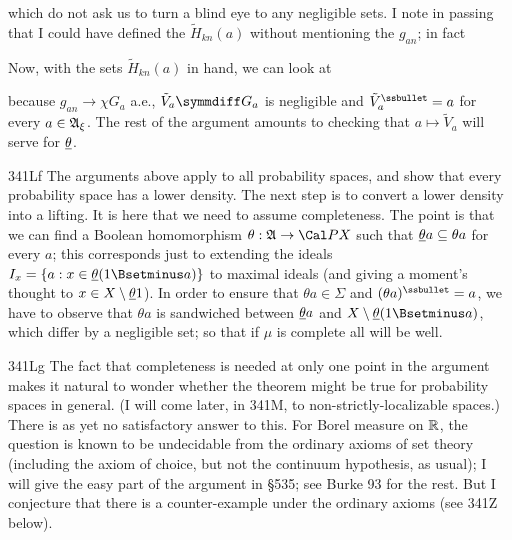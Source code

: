 {


\noindent which do not ask us to turn a blind eye to any negligible
sets.   I note in passing that I could have defined the
$\tilde H_{kn}(a)$ without mentioning the $g_{an}$;  in fact


\medskip

 Now, with the sets $\tilde H_{kn}(a)$ in hand, we can
look at


\noindent because $g_{an}\to \chi G_a$ a.e., $\tilde V_a\symmdiff G_a$
is negligible and $\tilde V_a^{\ssbullet}=a$ for every
$a\in\frak A_{\xi}$.   The rest of the argument amounts to checking that
$a\mapsto\tilde V_a$ will serve for $\underline{\theta}$.

\spheader 341Lf The arguments above apply to all probability spaces, and
show that every probability space has a lower density.   The next step
is to convert a lower density into a lifting.   It is here that we need
to assume completeness.   The point is that we can find a Boolean
homomorphism $\theta:\frak A\to\Cal PX$ such that $\underline{\theta}
a\subseteq\theta a$ for every $a$;   this corresponds just to extending
the ideals $I_x=\{a:x\in\undtheta(1\Bsetminus a)\}$ to maximal ideals
(and giving a moment's thought to $x\in X\setminus\underline{\theta} 1$).   In
order to ensure that $\theta a\in\Sigma$ and $(\theta a)^{\ssbullet}=a$,
we have to observe that $\theta a$ is sandwiched between $\underline{\theta} a$
and $X\setminus\undtheta(1\Bsetminus a)$, which differ by a negligible
set;  so that if $\mu$ is complete all will be well.

\spheader 341Lg The fact that completeness is needed at only one point
in the argument makes it natural to wonder whether the theorem might be
true for probability spaces in general.   (I will come later, in
341M, to non-strictly-localizable spaces.)   There is as yet no
satisfactory answer to this.   For Borel measure on $\Bbb R$, the
question is known to be undecidable from the ordinary axioms of set
theory (including the axiom of choice, but not the continuum hypothesis,
as usual);  I will give the easy part of the argument in \S535;
see {\smc Burke 93} for the rest.
But I conjecture that there is a counter-example under the ordinary
axioms (see 341Z below).

}
